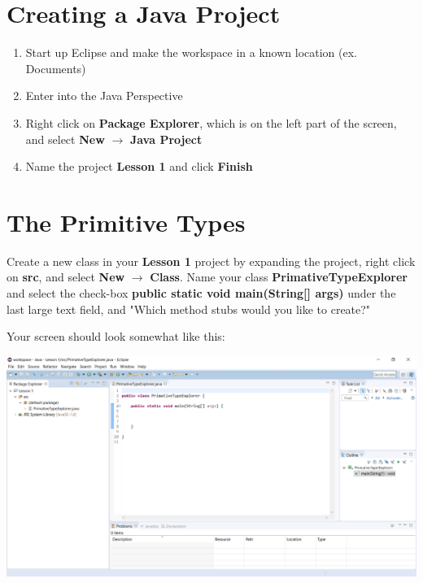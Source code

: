\documentclass[11pt,fleqn]{article}
\begin{document}
\section{Creating a Java Project}
\begin{enumerate}
\item Start up Eclipse and make the workspace in a known location (ex. Documents)
\item Enter into the Java Perspective
\item Right click on \textbf{Package Explorer}, which is on the left part of the screen, and select \textbf{New} $\rightarrow$ \textbf{Java Project}
\item Name the project \textbf{Lesson 1} and click \textbf{Finish}
\end{enumerate}

\section{The Primitive Types}
Create a new class in your \textbf{Lesson 1} project by expanding the project, right click on \textbf{src}, and select \textbf{New} $\rightarrow$ \textbf{Class}. Name your class \textbf{PrimativeTypeExplorer} and select the check-box \textbf{public static void main(String[] args)} under the last large text field, and "Which method stubs would you like to create?"

Your screen should look somewhat like this:

\includegraphics[scale=0.5]{Lesson_1_1.png}
\end{document}
